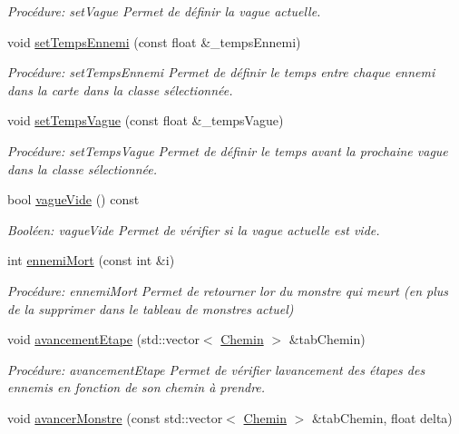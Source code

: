 \begin{DoxyCompactItemize}
\begin{DoxyCompactList}\small\item\em Procédure\+: set\+Vague Permet de définir la vague actuelle. \end{DoxyCompactList}\item 
void \hyperlink{classVague_ae9e45cad0c4a4da804f749e03952545c}{set\+Temps\+Ennemi} (const float \&\+\_\+temps\+Ennemi)
\begin{DoxyCompactList}\small\item\em Procédure\+: set\+Temps\+Ennemi Permet de définir le temps entre chaque ennemi dans la carte dans la classe sélectionnée. \end{DoxyCompactList}\item 
void \hyperlink{classVague_a3c9775c8351b1581afba79c0fd87171a}{set\+Temps\+Vague} (const float \&\+\_\+temps\+Vague)
\begin{DoxyCompactList}\small\item\em Procédure\+: set\+Temps\+Vague Permet de définir le temps avant la prochaine vague dans la classe sélectionnée. \end{DoxyCompactList}\item 
bool \hyperlink{classVague_aaa31d3deb82c73be899c478a55a6724f}{vague\+Vide} () const
\begin{DoxyCompactList}\small\item\em Booléen\+: vague\+Vide Permet de vérifier si la vague actuelle est vide. \end{DoxyCompactList}\item 
int \hyperlink{classVague_ad732fb032c4b02416946736b1e25dcc8}{ennemi\+Mort} (const int \&i)
\begin{DoxyCompactList}\small\item\em Procédure\+: ennemi\+Mort Permet de retourner l\textquotesingle{}or du monstre qui meurt (en plus de la supprimer dans le tableau de monstres actuel) \end{DoxyCompactList}\item 
void \hyperlink{classVague_ab61cff7242c22ec90c6cb4858b5a0bc6}{avancement\+Etape} (std\+::vector$<$ \hyperlink{classChemin}{Chemin} $>$ \&tab\+Chemin)
\begin{DoxyCompactList}\small\item\em Procédure\+: avancement\+Etape Permet de vérifier l\textquotesingle{}avancement des étapes des ennemis en fonction de son chemin à prendre. \end{DoxyCompactList}\item 
void \hyperlink{classVague_a2a81df1228dfa2ad84109612ef378d4c}{avancer\+Monstre} (const std\+::vector$<$ \hyperlink{classChemin}{Chemin} $>$ \&tab\+Chemin, float delta)

\end{DoxyCompactItemize}
